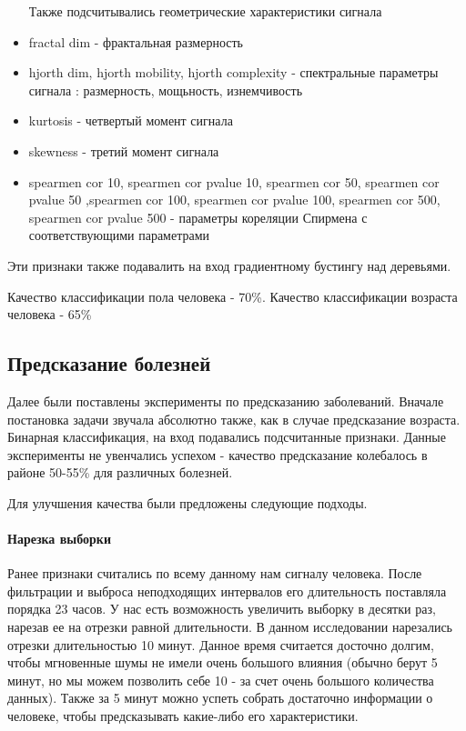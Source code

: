 \begin{itemize}
	Также подсчитывались геометрические характеристики сигнала
	
	\item fractal dim - фрактальная размерность
	\item hjorth dim, hjorth mobility, hjorth complexity - спектральные параметры сигнала : размерность, мощьность, изнемчивость
	\item kurtosis - четвертый момент сигнала
	\item skewness - третий момент сигнала
	\item spearmen cor 10, spearmen cor pvalue 10, spearmen cor 50, spearmen cor pvalue 50	
	,spearmen cor 100, spearmen cor pvalue 100, spearmen cor 500, spearmen cor pvalue 500 - 
	параметры кореляции Спирмена с соответствующими параметрами
\end{itemize}
Эти признаки также подавалить на вход градиентному бустингу над деревьями. 

Качество классификации пола человека - 70\%.
Качество классификации возраста человека - 65\%

\subsection{Предсказание болезней}

Далее были поставлены эксперименты по предсказанию заболеваний. Вначале постановка задачи звучала абсолютно также, как в случае предсказание возраста. Бинарная классификация, на вход подавались подсчитанные признаки. Данные эксперименты не увенчались успехом - качество предсказание колебалось в районе 50-55\% для различных болезней.

Для улучшения качества были предложены следующие подходы.

\paragraph{Нарезка выборки}

Ранее признаки считались по всему данному нам сигналу человека. После фильтрации и выброса неподходящих интервалов его длительность поставляла порядка 23 часов. У нас есть возможность увеличить выборку в десятки раз, нарезав ее на отрезки равной длительности. В данном исследовании нарезались отрезки длительностью 10 минут. Данное время считается досточно долгим, чтобы мгновенные шумы не имели очень большого влияния (обычно берут 5 минут, но мы можем позволить себе 10 - за счет очень большого количества данных). Также за 5 минут можно успеть собрать достаточно информации о человеке, чтобы предсказывать какие-либо его характеристики. 

